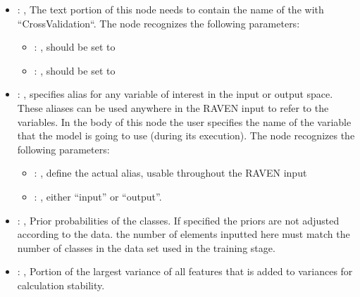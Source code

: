 \begin{itemize}
\begin{itemize}
        \item {}: ,
          List of IDs of features/variables to include in the transformation process.

        \item {}: ,
          Which space to search? Target or Feature?
      \end{itemize}

    \item {}: ,
      The text portion of this node needs to contain the name of the  with
               ``CrossValidation``.
      The  node recognizes the following parameters:
        \begin{itemize}
          \item {}: ,
            should be set to 
          \item {}: ,
            should be set to 
      \end{itemize}

    \item {}: ,
      specifies alias for         any variable of interest in the input or output space. These
      aliases can be used anywhere in the RAVEN input to         refer to the variables. In the body
      of this node the user specifies the name of the variable that the model is going to use
      (during its execution).
      The  node recognizes the following parameters:
        \begin{itemize}
          \item {}: ,
            define the actual alias, usable throughout the RAVEN input
          \item {}: ,
            either ``input'' or ``output''.
      \end{itemize}

    \item {}: ,
      Prior probabilities of the classes. If specified the priors are
      not adjusted according to the data. \nb the number of elements inputted here must
      match the number of classes in the data set used in the training stage.

    \item {}: ,
      Portion of the largest variance of all features that is added to variances for
      calculation stability.
  \end{itemize}


